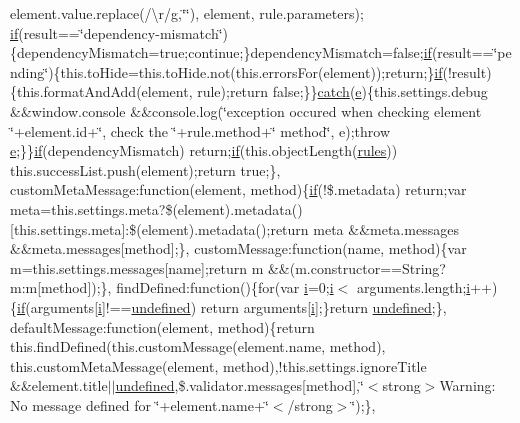\begin{DoxyCompactItemize}
element.\+value.\+replace(/\textbackslash{}r/\hyperlink{_scripts_2respond_8min_8js_a103df269476e78897c9c4c6cb8f4eb06}{g},\char`\"{}\char`\"{}), element, rule.\+parameters);   \hyperlink{_scripts_2respond_8min_8js_a93851d60dd037a83509a1757b9ee7b66}{if}(result==\char`\"{}dependency-\/mismatch\char`\"{})\{dependency\+Mismatch=true;continue;\}dependency\+Mismatch=false;\hyperlink{_scripts_2respond_8min_8js_a93851d60dd037a83509a1757b9ee7b66}{if}(result==\char`\"{}pending\char`\"{})\{this.\+to\+Hide=this.\+to\+Hide.\+not(this.\+errors\+For(element));return;\}\hyperlink{_scripts_2respond_8min_8js_a93851d60dd037a83509a1757b9ee7b66}{if}(!result)\{this.\+format\+And\+Add(element, rule);return false;\}\}\hyperlink{_scripts_2jquery-1_810_82_8js_a5bf45fc51bc0426586792b5f9cb95431}{catch}(\hyperlink{_scripts_2respond_8min_8js_a2c038346d47955cbe2cb91e338edd7e1}{e})\{this.\+settings.\+debug \&\&window.\+console \&\&console.\+log(\char`\"{}exception occured when checking element \char`\"{}+element.\+id+\char`\"{}, check the \textquotesingle{}\char`\"{}+rule.\+method+\char`\"{}\textquotesingle{} method\char`\"{}, e);throw \hyperlink{_scripts_2respond_8min_8js_a2c038346d47955cbe2cb91e338edd7e1}{e};\}\}\hyperlink{_scripts_2respond_8min_8js_a93851d60dd037a83509a1757b9ee7b66}{if}(dependency\+Mismatch) return;\hyperlink{_scripts_2respond_8min_8js_a93851d60dd037a83509a1757b9ee7b66}{if}(this.\+object\+Length(\hyperlink{_scripts_2respond_8js_ada87c2e257bc5ff6e77cdbc23ed986a3}{rules})) this.\+success\+List.\+push(element);return true;\},   custom\+Meta\+Message\+:function(element, method)\{\hyperlink{_scripts_2respond_8min_8js_a93851d60dd037a83509a1757b9ee7b66}{if}(!\$.metadata) return;var meta=this.\+settings.\+meta?\$(element).metadata()\mbox{[}this.\+settings.\+meta\mbox{]}\+:\$(element).metadata();return meta \&\&meta.\+messages \&\&meta.\+messages\mbox{[}method\mbox{]};\}, custom\+Message\+:function(name, method)\{var m=this.\+settings.\+messages\mbox{[}name\mbox{]};return m \&\&(m.\+constructor==String?m\+:m\mbox{[}method\mbox{]});\}, find\+Defined\+:function()\{for(var \hyperlink{_scripts_2respond_8min_8js_a5e25b1d1bed9ab5f3174b76d6a722180}{i}=0;\hyperlink{_scripts_2respond_8min_8js_a5e25b1d1bed9ab5f3174b76d6a722180}{i}$<$ arguments.\+length;\hyperlink{_scripts_2respond_8min_8js_a5e25b1d1bed9ab5f3174b76d6a722180}{i}++)\{\hyperlink{_scripts_2respond_8min_8js_a93851d60dd037a83509a1757b9ee7b66}{if}(arguments\mbox{[}\hyperlink{_scripts_2respond_8min_8js_a5e25b1d1bed9ab5f3174b76d6a722180}{i}\mbox{]}!==\hyperlink{_scripts_2jquery-1_810_82_8js_a08113a236cc18d2a9d5ce27e638012be}{undefined}) return arguments\mbox{[}\hyperlink{_scripts_2respond_8min_8js_a5e25b1d1bed9ab5f3174b76d6a722180}{i}\mbox{]};\}return \hyperlink{_scripts_2jquery-1_810_82_8js_a08113a236cc18d2a9d5ce27e638012be}{undefined};\}, default\+Message\+:function(element, method)\{return this.\+find\+Defined(this.\+custom\+Message(element.\+name, method), this.\+custom\+Meta\+Message(element, method),!this.\+settings.\+ignore\+Title \&\&element.\+title$\vert$$\vert$\hyperlink{_scripts_2jquery-1_810_82_8js_a08113a236cc18d2a9d5ce27e638012be}{undefined},\$.validator.\+messages\mbox{[}method\mbox{]},\char`\"{}$<$strong$>$Warning\+: No message defined for \char`\"{}+element.\+name+\char`\"{}$<$/strong$>$\char`\"{});\}, 
\end{DoxyCompactItemize}

